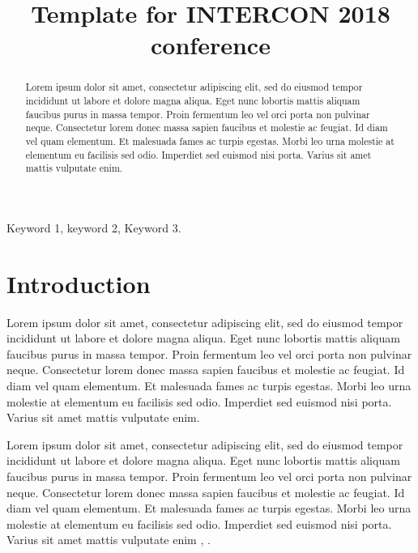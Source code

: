 \documentclass[conference]{IEEEtran}
\begin{document}
\title{Template for INTERCON 2018 conference}

\author{
}

\maketitle

\begin{abstract}
Lorem ipsum dolor sit amet, consectetur adipiscing elit, sed do eiusmod tempor incididunt ut labore et dolore magna aliqua. Eget nunc lobortis mattis aliquam faucibus purus in massa tempor. Proin fermentum leo vel orci porta non pulvinar neque. Consectetur lorem donec massa sapien faucibus et molestie ac feugiat. Id diam vel quam elementum. Et malesuada fames ac turpis egestas. Morbi leo urna molestie at elementum eu facilisis sed odio. Imperdiet sed euismod nisi porta. Varius sit amet mattis vulputate enim.
\end{abstract}

\begin{IEEEkeywords}
Keyword 1, keyword 2, Keyword 3.
\end{IEEEkeywords}





\section{Introduction}

Lorem ipsum dolor sit amet, consectetur adipiscing elit, sed do eiusmod tempor incididunt ut labore et dolore magna aliqua. Eget nunc lobortis mattis aliquam faucibus purus in massa tempor. Proin fermentum leo vel orci porta non pulvinar neque. Consectetur lorem donec massa sapien faucibus et molestie ac feugiat. Id diam vel quam elementum. Et malesuada fames ac turpis egestas. Morbi leo urna molestie at elementum eu facilisis sed odio. Imperdiet sed euismod nisi porta. Varius sit amet mattis vulputate enim.

Lorem ipsum dolor sit amet, consectetur adipiscing elit, sed do eiusmod tempor incididunt ut labore et dolore magna aliqua. Eget nunc lobortis mattis aliquam faucibus purus in massa tempor. Proin fermentum leo vel orci porta non pulvinar neque. Consectetur lorem donec massa sapien faucibus et molestie ac feugiat. Id diam vel quam elementum. Et malesuada fames ac turpis egestas. Morbi leo urna molestie at elementum eu facilisis sed odio. Imperdiet sed euismod nisi porta. Varius sit amet mattis vulputate enim \cite{b1}, \cite{b2}. 
\end{document}
